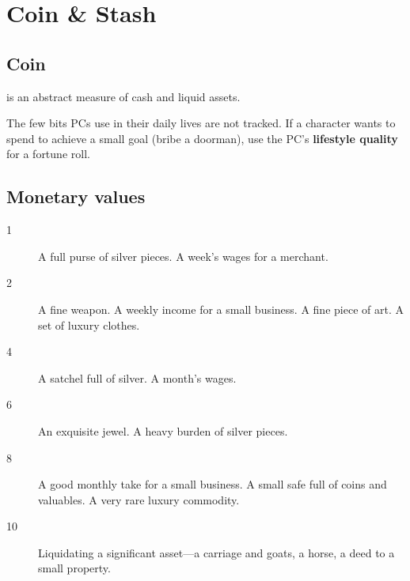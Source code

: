 
\section{Coin \& Stash}


\subsection{Coin}

 is an abstract measure of cash and liquid assets.

The few bits PCs use in their daily lives are not tracked. If a character wants to spend to achieve a small goal (bribe a doorman), use the PC’s \textbf{lifestyle quality} for a fortune roll.

\subsection{Monetary values}

\begin{description}
\item[1 ] A full purse of silver pieces. A week’s wages for a merchant.
\item[2 ] A fine weapon. A weekly income for a small business. A fine piece of art. A set of luxury clothes.
\item[4 ] A satchel full of silver. A month’s wages.
\item[6 ] An exquisite jewel. A heavy burden of silver pieces.
\item[8 ] A good monthly take for a small business. A small safe full of coins and valuables. A very rare luxury commodity.
\item[10 ] Liquidating a significant asset—a carriage and goats, a horse, a deed to a small property.
\end{description}

